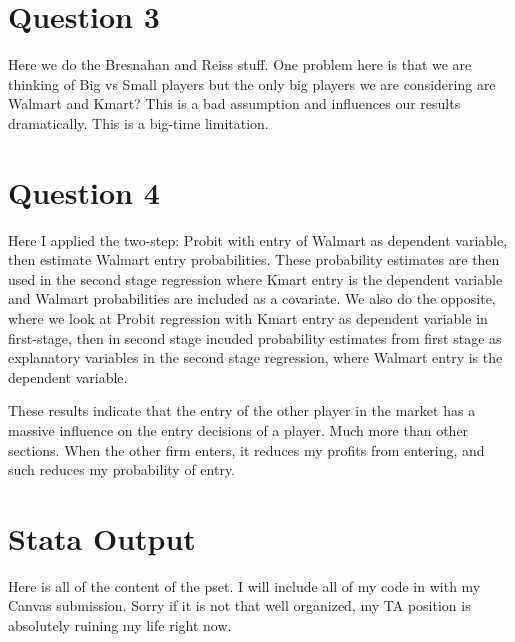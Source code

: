 \documentclass[11pt]{article} %
\begin{document}
\section{Question 3}
Here we do the Bresnahan and Reiss stuff. One problem here is that we are thinking of Big vs Small players but the only big players we are considering are Walmart and Kmart? This is a bad assumption and influences our results dramatically. This is a big-time limitation.

\section{Question 4}

Here I applied the two-step: Probit with entry of Walmart as dependent variable, then estimate Walmart entry probabilities. These probability estimates are then used in the second stage regression where Kmart entry is the dependent variable and Walmart probabilities are included as a covariate. We also do the opposite, where we look at Probit regression with Kmart entry as dependent variable in first-stage, then in second stage incuded probability estimates from first stage as explanatory variables in the second stage regression, where Walmart entry is the dependent variable.

These results indicate that the entry of the other player in the market has a massive influence on the entry decisions of a player. Much more than other sections. When the other firm enters, it reduces my profits from entering, and such reduces my probability of entry.

\section{Stata Output}
Here is all of the content of the pset. I will include all of my code in with my Canvas submission. Sorry if it is not that well organized, my TA position is absolutely ruining my life right now.
\end{document}
